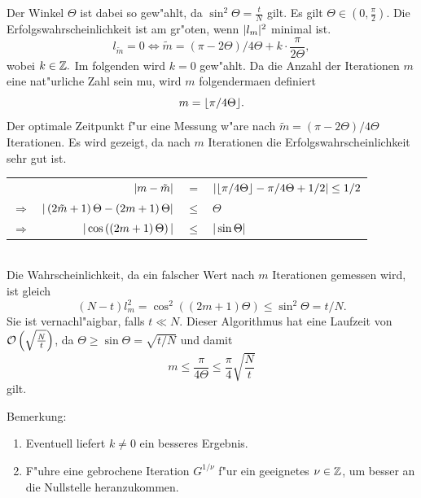          Der Winkel $\Theta$ ist dabei so gew"ahlt, da\3 $\sin^2\Theta =\frac{t}{N}$ gilt. Es gilt $\Theta \in \left(0,\frac{\pi}{2} \right)$. 
         Die Erfolgswahrscheinlichkeit ist am gr"o\3ten, wenn $\vert l_m \vert^2$ minimal ist.
         $$ l_{\tilde m} = 0 \iff \tilde m = \left( \pi - 2\Theta \right) / 4\Theta + k\cdot \frac{\pi}{2\Theta}, $$ 
         wobei $k\in\mathbb{Z}.$ Im folgenden wird $k=0$ gew"ahlt.
         Da die Anzahl der Iterationen $m$ eine nat"urliche Zahl sein mu\3, wird $m$ folgenderma\3en definiert 
         $$ m = \lfloor \pi / 4\Theta \rfloor.$$ 
         Der optimale Zeitpunkt f"ur eine Messung w"are nach $ \tilde m = \left( \pi - 2\Theta \right) / 4\Theta $ Iterationen. Es wird gezeigt, da\3 nach
         $m$ Iterationen die Erfolgswahrscheinlichkeit sehr gut ist. \\ 
         \begin{tabular}{crcl} 
                         & $\vert m - \tilde m \vert$ &   $=$   & $\vert \lfloor \pi /4\Theta \rfloor - \pi /4\Theta + 1/2 \vert \le 1/2$          \\ 
           $\Rightarrow$ & $\vert \left( 2\tilde m + 1\right)\Theta - \left( 2m + 1\right)\Theta \vert$ & $\le$ & $\Theta$              \\ 
           $\Rightarrow$ & $\vert \cos\left(\left(2m+1\right)\Theta\right) \vert$                       & $\le$ & $\vert \sin\Theta \vert$ \\ 
         \end{tabular} \\ 
         Die Wahrscheinlichkeit, da\3 ein falscher Wert nach $m$ Iterationen gemessen wird, ist gleich 
         $$ \left( N-t\right) l_m^2 = \cos^2\left(\left(2m+1\right)\Theta\right) \le \sin^2\Theta = t/N. $$ 
         Sie ist vernachl"a\3igbar, falls $t \ll N$. Dieser Algorithmus hat eine Laufzeit von ${\cal O}\left(\sqrt{\frac{N}{t}}\right)$, da 
         $\Theta \ge \sin\Theta = \sqrt{t/N}$ und damit  
         $$ m \le \frac{\pi}{4\Theta} \le \frac{\pi}{4} \sqrt{\frac{N}{t}} $$ 
         gilt. 
        
         Bemerkung: 
         \begin{enumerate}
           \item Eventuell liefert $k\neq 0$ ein besseres Ergebnis.
           \item F"uhre eine gebrochene Iteration $G^{1/\nu}$ f"ur ein geeignetes $\nu\in\mathbb{Z}$, um besser an die Nullstelle heranzukommen.
         \end{enumerate}

